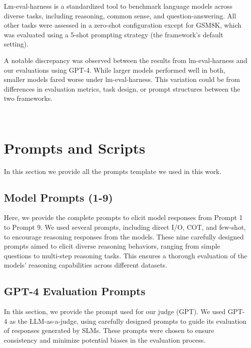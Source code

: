 \medskip

Lm-eval-harness is a standardized tool to benchmark language models across diverse tasks, including reasoning, common sense, and question-answering. All other tasks were assessed in a zero-shot configuration except for GSM8K, which was evaluated using a 5-shot prompting strategy (the framework’s default setting).\medskip

A notable discrepancy was observed between the results from lm-eval-harness and our evaluations using GPT-4. While larger models performed well in both, smaller models fared worse under lm-eval-harness. This variation could be from differences in evaluation metrics, task design, or prompt structures between the two frameworks. 



\newpage
~\newpage
~\newpage



\section{Prompts and Scripts}
\label{app: Prompts and Scripts}

In this section we provide all the prompts template we used in this work. 

\subsection{Model Prompts (1-9)}
Here, we provide the complete prompts to elicit model responses from Prompt 1 to Prompt 9. We used several prompts, including direct I/O, COT, and few-shot, to encourage reasoning responses from the models. These nine carefully designed prompts aimed to elicit diverse reasoning behaviors, ranging from simple questions to multi-step reasoning tasks. This ensures a thorough evaluation of the models' reasoning capabilities across different datasets.




\subsection{GPT-4 Evaluation Prompts}
\label{app: GPT-4 Evaluation Prompts}
In this section, we provide the prompt used for our judge (GPT). We used GPT-4 as the LLM-as-a-judge, using carefully designed prompts to guide its evaluation of responses generated by SLMs. These prompts were chosen to ensure consistency and minimize potential biases in the evaluation process.

